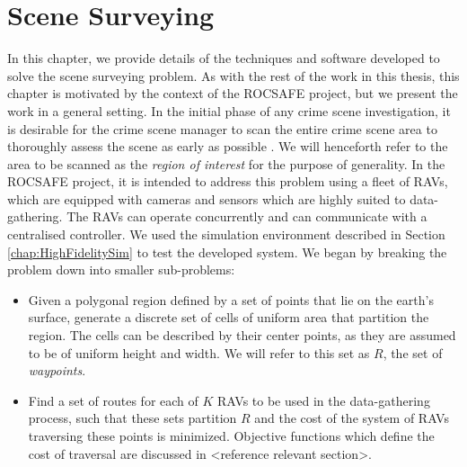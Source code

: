 \chapter{Scene Surveying}\label{chapter:SceneSurveying}
In this chapter, we provide details of the techniques and software developed to solve the scene surveying problem.
As with the rest of the work in this thesis, this chapter is motivated by the context of the ROCSAFE project, but we present the work in a general setting. In the initial phase of any crime scene investigation, it is desirable for the crime scene manager to scan the entire crime scene area to thoroughly assess the scene as early as possible \cite{TechnicalWorkingGrouponCrimeSceneInvestigation2013CrimeEnforcement}. We will henceforth refer to the area to be scanned as the \textit{region of interest} for the purpose of generality. In the ROCSAFE project, it is intended to address this problem using a fleet of RAVs, which are equipped with cameras and sensors which are highly suited to data-gathering. The RAVs can operate concurrently and can communicate with a centralised controller.
We used the simulation environment described in Section \ref{chap:HighFidelitySim} to test the developed system.
We began by breaking the problem down into smaller sub-problems:
\begin{itemize}
    \item Given a polygonal region defined by a set of points that lie on the earth's surface, generate a discrete set of cells of uniform area that partition the region.
    The cells can be described by their center points, as they are assumed to be of uniform height and width. We will refer to this set as $R$, the set of \textit{waypoints}.
    \item Find a set of routes for each of $K$ RAVs to be used in the data-gathering process, such that these sets partition $R$ and the cost of the system of RAVs traversing these points is minimized. Objective functions which define the cost of traversal are discussed in <reference relevant section>.
\end{itemize}


